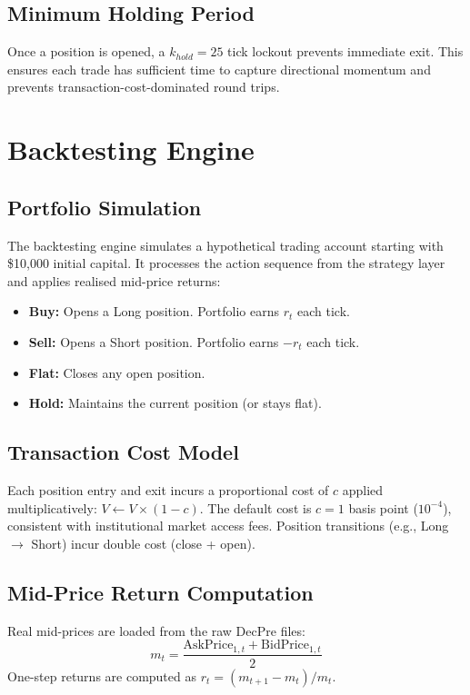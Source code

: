 \documentclass[conference]{IEEEtran}
\begin{document}
\subsection{Minimum Holding Period}
Once a position is opened, a $k_{hold}=25$ tick lockout prevents
immediate exit. This ensures each trade has sufficient time to capture
directional momentum and prevents transaction-cost-dominated round trips.

\section{Backtesting Engine}

\subsection{Portfolio Simulation}
The backtesting engine simulates a hypothetical trading account starting
with \$10,000 initial capital. It processes the action sequence from the
strategy layer and applies realised mid-price returns:

\begin{itemize}
    \item \textbf{Buy:} Opens a Long position. Portfolio earns $r_t$ each tick.
    \item \textbf{Sell:} Opens a Short position. Portfolio earns $-r_t$ each tick.
    \item \textbf{Flat:} Closes any open position.
    \item \textbf{Hold:} Maintains the current position (or stays flat).
\end{itemize}

\subsection{Transaction Cost Model}
Each position entry and exit incurs a proportional cost of $c$ applied
multiplicatively: $V \leftarrow V \times (1 - c)$. The default cost is
$c = 1$ basis point ($10^{-4}$), consistent with institutional market
access fees. Position transitions (e.g., Long $\rightarrow$ Short) incur
double cost (close + open).

\subsection{Mid-Price Return Computation}
Real mid-prices are loaded from the raw DecPre files:
\begin{equation}
    m_t = \frac{\text{AskPrice}_{1,t} + \text{BidPrice}_{1,t}}{2}
\end{equation}
One-step returns are computed as $r_t = (m_{t+1} - m_t) / m_t$.
\end{document}
